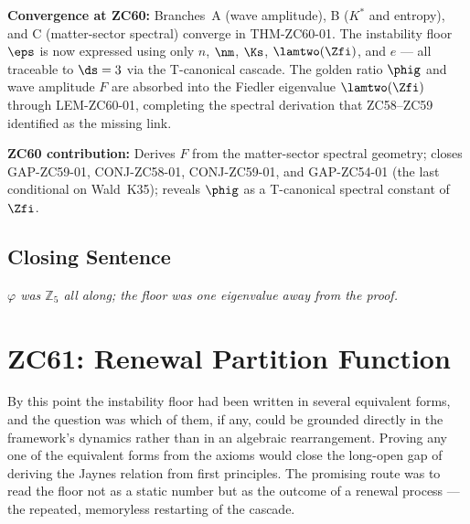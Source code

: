 \documentclass[12pt, a4paper]{article}
\begin{document}
\begin{genealogybox}[title={How ZC60's Key Objects Trace Back
  through the Z-Programme}]
\textbf{Convergence at ZC60:}
Branches~A (wave amplitude), B ($K^*$ and entropy), and
C (matter-sector spectral) converge in THM-ZC60-01.
The instability floor $\eps$ is now expressed using only
$n$, $\nm$, $\Ks$, $\lamtwo(\Zfi)$, and $e$ --- all
traceable to $\ds=3$ via the T-canonical cascade.
The golden ratio $\phig$ and wave amplitude $F$ are
absorbed into the Fiedler eigenvalue $\lamtwo(\Zfi)$
through LEM-ZC60-01, completing the spectral derivation
that ZC58--ZC59 identified as the missing link.

\textbf{ZC60 contribution:} Derives $F$ from the
matter-sector spectral geometry; closes GAP-ZC59-01,
CONJ-ZC58-01, CONJ-ZC59-01, and GAP-ZC54-01
(the last conditional on Wald~K35); reveals $\phig$ as
a T-canonical spectral constant of $\Zfi$.
\end{genealogybox}

\subsection{Closing Sentence}

\bigskip
\begin{center}
\textit{$\varphi$ was $\mathbb{Z}_5$ all along;
  the floor was one eigenvalue away from the proof.}
\end{center}


\section{ZC61: Renewal Partition Function}

By this point the instability floor had been written in several equivalent
forms, and the question was which of them, if any, could be grounded directly in
the framework's dynamics rather than in an algebraic rearrangement. Proving any
one of the equivalent forms from the axioms would close the long-open gap of
deriving the Jaynes relation from first principles. The promising route was to
read the floor not as a static number but as the outcome of a renewal process ---
the repeated, memoryless restarting of the cascade.
\end{document}
